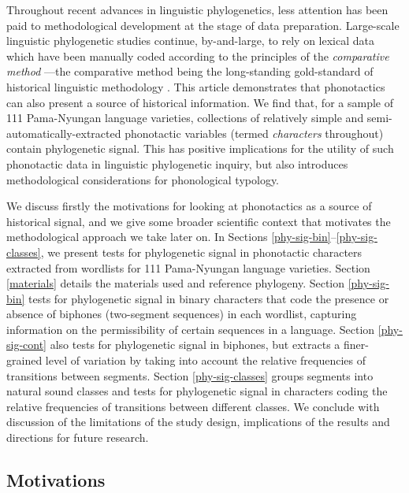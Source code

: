 Throughout recent advances in linguistic phylogenetics, less attention has been paid to methodological development at the stage of data preparation. Large-scale linguistic phylogenetic studies continue, by-and-large, to rely on lexical data which have been manually coded according to the principles of the \emph{comparative method} \autocites[as described by][]{meillet_methode_1925}{campbell_historical_2004}{weiss_comparative_2014}---the comparative method being the long-standing gold-standard of historical linguistic methodology \autocites{chang_ancestry-constrained_2015}{bouckaert_origin_2018}{kolipakam_bayesian_2018}. This article demonstrates that phonotactics can also present a source of historical information. We find that, for a sample of 111 Pama-Nyungan language varieties, collections of relatively simple and semi-automatically-extracted phonotactic variables (termed \emph{characters} throughout) contain phylogenetic signal. This has positive implications for the utility of such phonotactic data in linguistic phylogenetic inquiry, but also introduces methodological considerations for phonological typology.

We discuss firstly the motivations for looking at phonotactics as a source of historical signal, and we give some broader scientific context that motivates the methodological approach we take later on. In Sections \ref{phy-sig-bin}--\ref{phy-sig-classes}, we present tests for phylogenetic signal in phonotactic characters extracted from wordlists for 111 Pama-Nyungan language varieties. Section \ref{materials} details the materials used and reference phylogeny. Section \ref{phy-sig-bin} tests for phylogenetic signal in binary characters that code the presence or absence of biphones (two-segment sequences) in each wordlist, capturing information on the permissibility of certain sequences in a language. Section \ref{phy-sig-cont} also tests for phylogenetic signal in biphones, but extracts a finer-grained level of variation by taking into account the relative frequencies of transitions between segments. Section \ref{phy-sig-classes} groups segments into natural sound classes and tests for phylogenetic signal in characters coding the relative frequencies of transitions between different classes. We conclude with discussion of the limitations of the study design, implications of the results and directions for future research.

\hypertarget{motiv}{%
\subsection{Motivations}\label{motiv}}

